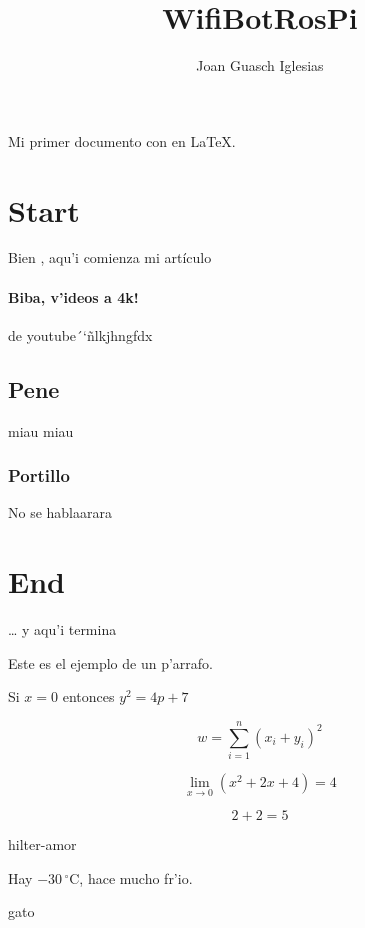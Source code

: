 \documentclass[a4paper]{article}
\title{WifiBotRosPi}
\author{Joan Guasch Iglesias}
\date{} %
\begin{document}
\maketitle Mi primer documento con en \LaTeX{}.

\newpage

\tableofcontents

\newpage

\section{Start}
Bien , aqu'i comienza mi artículo

\paragraph{Biba, v'ideos a 4k!}
de youtube´`ñlkjhngfdx

\subsection{Pene}
miau miau

\subsubsection{Portillo}
No se hablaarara
\section{End}

\ldots{} y aqu'i termina


Este es el ejemplo de un p'arrafo.

Si $x = 0$ entonces $y^{2} = 4p +7$

\begin{equation}
w = \sum_{i=1} ^{n}(x_{i}+y_{i})^{2}
\end{equation}

\begin{equation*}
 \lim_{x \to 0}  (x^{2} + 2x + 4) = 4
\end{equation*}

\begin{equation}
 2+2=5
\end{equation}

hilter-amor

Hay $-30\,^{\circ}\mathrm{C}$, hace mucho fr'io.


gato
\end{document}

